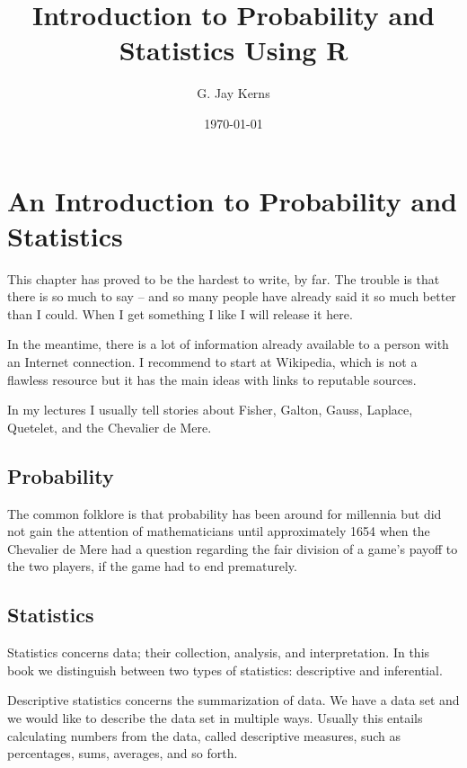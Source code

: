 \documentclass[captions=tableheading]{scrbook}
\title{Introduction to Probability and Statistics Using R}
\author{G. Jay Kerns}
\date{\today}
\begin{document}
\maketitle







\chapter{An Introduction to Probability and Statistics}
\label{sec-1}


\noindent 
This chapter has proved to be the hardest to write, by far. The trouble is that there is so much to say -- and so many people have already said it so much better than I could. When I get something I like I will release it here.

In the meantime, there is a lot of information already available to a person with an Internet connection. I recommend to start at Wikipedia, which is not a flawless resource but it has the main ideas with links to reputable sources.

In my lectures I usually tell stories about Fisher, Galton, Gauss, Laplace, Quetelet, and the Chevalier de Mere.
\section{Probability}
\label{sec-1-1}


The common folklore is that probability has been around for millennia but did not gain the attention of mathematicians until approximately 1654 when the Chevalier de Mere had a question regarding the fair division of a game's payoff to the two players, if the game had to end prematurely.
\section{Statistics}
\label{sec-1-2}


Statistics concerns data; their collection, analysis, and interpretation. In this book we distinguish between two types of statistics: descriptive and inferential. 

Descriptive statistics concerns the summarization of data. We have a data set and we would like to describe the data set in multiple ways. Usually this entails calculating numbers from the data, called descriptive measures, such as percentages, sums, averages, and so forth.
\end{document}
